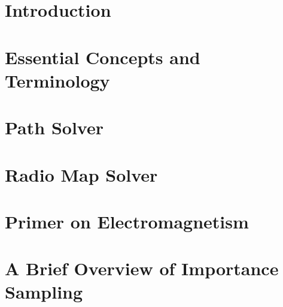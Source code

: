 \documentclass[10pt,logo]{nvidiatechreport}
\begin{document}
\printglossary[type=\acronymtype, title={List of Acronyms}]

\newpage

\section{Introduction}
\label{sec:introduction}


\newpage
\section{Essential Concepts and Terminology}
\label{sec:essential-concepts}


\newpage
\section{Path Solver}
\label{sec:path-solver}


\newpage
\section{Radio Map Solver}
\label{sec:radio-map-solver}


\newpage
\appendix

\section{Primer on Electromagnetism}
\label{sec:primer-em}


\section{A Brief Overview of Importance Sampling}
\label{sec:importance-sampling}

\end{document}
